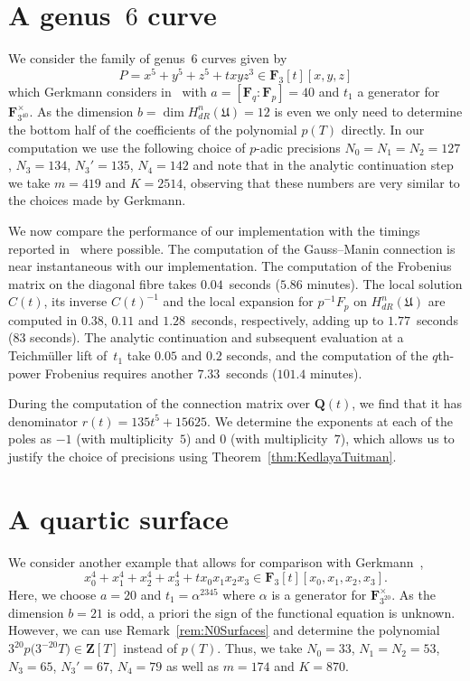 \section{A genus~$6$ curve}

We consider the family of genus~$6$ curves given by 
\begin{equation}
P = x^5 + y^5 + z^5 + t x y z^3 \in \mathbf{F}_3[t][x,y,z]
\end{equation}
which Gerkmann considers in~\citep[\S 7.4]{Gerkmann2007} with 
$a = [\mathbf{F}_q : \mathbf{F}_p] = 40$ and $t_1$ a 
generator for $\mathbf{F}_{3^{40}}^{\times}$.  As the dimension 
$b = \dim H_{dR}^n(\mathfrak{U}) = 12$ is even we only need to 
determine the bottom half of the coefficients of the polynomial 
$p(T)$ directly.  In our computation we use the following choice of 
$p$-adic precisions $N_0 = N_1 = N_2 = 127$, $N_3 = 134$, $N_3' = 135$, 
$N_4 = 142$ and note that in the analytic continuation step we 
take $m = 419$ and $K = 2514$, observing that these numbers are 
very similar to the choices made by Gerkmann.

We now compare the performance of our implementation with the 
timings reported in~\citep[\S 7.4]{Gerkmann2007} where possible.  
The computation of the Gauss--Manin connection is near instantaneous 
with our implementation.  The computation of the Frobenius matrix on 
the diagonal fibre takes $0.04$~seconds ($5.86$ minutes).  The local 
solution $C(t)$, its inverse $C(t)^{-1}$ and the local expansion for 
$p^{-1}F_p$ on $H_{dR}^n(\mathfrak{U})$ are computed in $0.38$, 
$0.11$ and $1.28$~seconds, respectively, adding up to $1.77$~seconds 
($83$ seconds).  The analytic continuation and subsequent evaluation 
at a Teichm\"uller lift of~$t_1$ take $0.05$ and $0.2$ seconds, and 
the computation of the $q$th-power Frobenius requires another 
$7.33$~seconds ($101.4$ minutes).

During the computation of the connection matrix over $\mathbf{Q}(t)$, 
we find that it has denominator $r(t) = 135 t^5 + 15625$.  We 
determine the exponents at each of the poles as $-1$ (with multiplicity~$5$) 
and $0$ (with multiplicity~$7$), which allows us to justify the choice 
of precisions using Theorem~\ref{thm:KedlayaTuitman}.

\section{A quartic surface}

We consider another example that allows for comparison with 
Gerkmann~\citep[\S 7.5]{Gerkmann2007},
\begin{equation}
x_0^4 + x_1^4 + x_2^4 + x_3^4 + t x_0 x_1 x_2 x_3 \in \mathbf{F}_3[t][x_0,x_1,x_2,x_3].
\end{equation}
Here, we choose $a = 20$ and $t_1 = \alpha^{2345}$ where 
$\alpha$ is a generator for $\mathbf{F}_{3^{20}}^{\times}$. 
As the dimension $b = 21$ is odd, a priori the sign of the 
functional equation is unknown.  However, we can use 
Remark~\ref{rem:N0Surfaces} and determine the polynomial 
$3^{20} p\bigl(3^{-20} T\bigr) \in \mathbf{Z}[T]$ instead of $p(T)$. 
Thus, we take $N_0 = 33$, $N_1 = N_2 = 53$, $N_3 = 65$, 
$N_3' = 67$, $N_4 = 79$ as well as $m = 174$ and $K = 870$.

